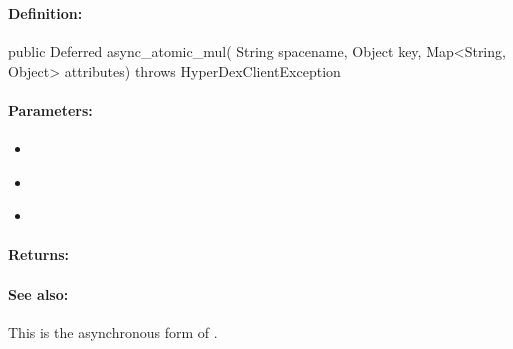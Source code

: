 \pagebreak
\subsubsection{}
\label{api:java:async_atomic_mul}


\paragraph{Definition:}
\begin{javacode}
public Deferred async_atomic_mul(
        String spacename,
        Object key,
        Map<String, Object> attributes) throws HyperDexClientException
\end{javacode}

\paragraph{Parameters:}
\begin{itemize}[noitemsep]
\item {}\\

\item {}\\

\item {}\\

\end{itemize}

\paragraph{Returns:}


\paragraph{See also:}  This is the asynchronous form of .

\pagebreak
\subsubsection{}
\label{api:java:cond_atomic_mul}



